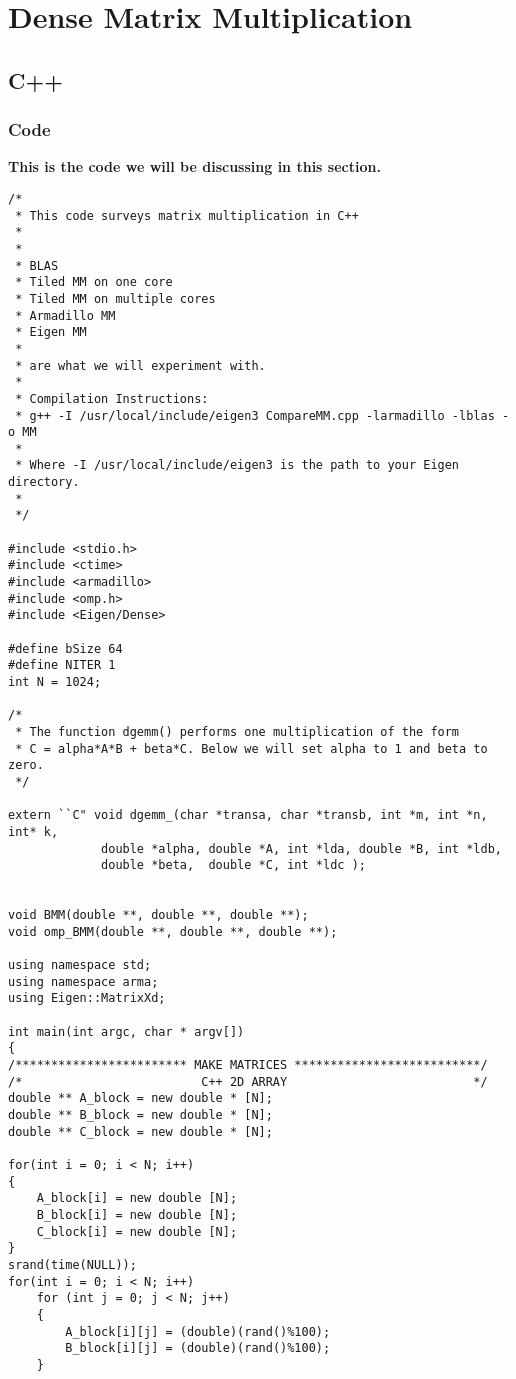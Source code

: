 \chapter{Dense Matrix Multiplication}
\section{C++}
\subsection{Code}
\begin{center}
\textbf{This is the code we will be discussing in this section.}
\begin{lstlisting}
/*
 * This code surveys matrix multiplication in C++
 * 
 * 
 * BLAS
 * Tiled MM on one core
 * Tiled MM on multiple cores
 * Armadillo MM
 * Eigen MM
 * 
 * are what we will experiment with.
 * 
 * Compilation Instructions: 
 * g++ -I /usr/local/include/eigen3 CompareMM.cpp -larmadillo -lblas -o MM
 * 
 * Where -I /usr/local/include/eigen3 is the path to your Eigen directory.
 * 
 */  

#include <stdio.h>
#include <ctime>
#include <armadillo>
#include <omp.h>
#include <Eigen/Dense>

#define bSize 64
#define NITER 1
int N = 1024;

/*
 * The function dgemm() performs one multiplication of the form 
 * C = alpha*A*B + beta*C. Below we will set alpha to 1 and beta to zero.
 */

extern ``C" void dgemm_(char *transa, char *transb, int *m, int *n, int* k, 
			 double *alpha, double *A, int *lda, double *B, int *ldb,
			 double *beta,  double *C, int *ldc ); 


void BMM(double **, double **, double **);
void omp_BMM(double **, double **, double **);

using namespace std;
using namespace arma;
using Eigen::MatrixXd;

int main(int argc, char * argv[])
{
/************************ MAKE MATRICES **************************/
/*                         C++ 2D ARRAY                          */
double ** A_block = new double * [N];
double ** B_block = new double * [N];
double ** C_block = new double * [N];

for(int i = 0; i < N; i++)
{
	A_block[i] = new double [N];
	B_block[i] = new double [N];
	C_block[i] = new double [N];
}
srand(time(NULL));
for(int i = 0; i < N; i++)
	for (int j = 0; j < N; j++)
	{
		A_block[i][j] = (double)(rand()%100);
		B_block[i][j] = (double)(rand()%100);
	}	
	

\end{lstlisting}
\end{center}
